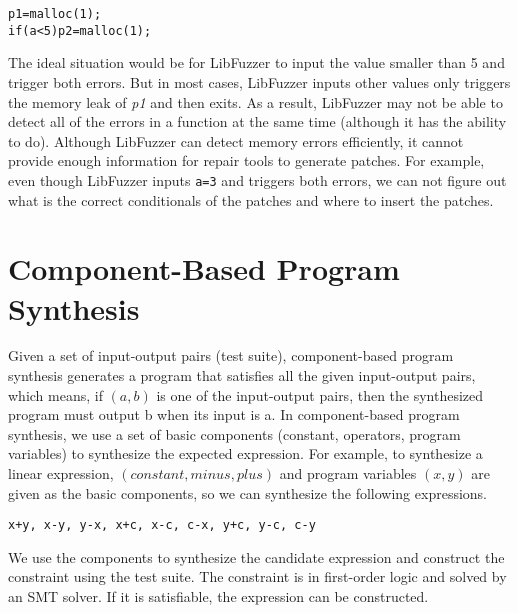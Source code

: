 \documentclass[a4paper,11pt,oneside,openany]{book}
\begin{document}
\begin{minipage}{\textwidth}
    \vspace{0.2cm}
    \hspace{0.3cm}\verb|p1=malloc(1);|\\\hspace{0.3cm}\verb|if(a<5)p2=malloc(1);|\\
\end{minipage}
The ideal situation would be for LibFuzzer to input the value smaller than 5 and trigger both errors. But in most cases,  LibFuzzer inputs other values only triggers the memory leak of {\it p1} and then exits. As a result, LibFuzzer may not be able to detect all of the errors in a function at the same time (although it has the ability to do). Although LibFuzzer can detect memory errors efficiently, it cannot provide enough information for repair tools to generate patches. For example, even though LibFuzzer inputs \verb|a=3| and triggers both errors, we can not figure out what is the correct conditionals of the patches and where to insert the patches.

\section{Component-Based Program Synthesis}

Given a set of input-output pairs (test suite), component-based program synthesis generates a program that satisfies all the given input-output pairs, which means, if $(a,b)$ is one of the input-output pairs, then the synthesized program must output b when its input is a. In component-based program synthesis, we use a set of basic components (constant, operators, program variables) to synthesize the expected expression. For example, to synthesize a linear expression, $(constant, minus, plus)$ and program variables $(x, y)$ are given as the basic components, so we can synthesize the following expressions. 

\begin{minipage}{\textwidth}
    \vspace{0.2cm}
    \hspace{0.3cm}\verb|x+y, x-y, y-x, x+c, x-c, c-x, y+c, y-c, c-y|\\
\end{minipage}
We use the components to synthesize the candidate expression and construct the constraint using the test suite. The constraint is in first-order logic and solved by an SMT solver. If it is satisfiable, the expression can be constructed. 
\end{document}
